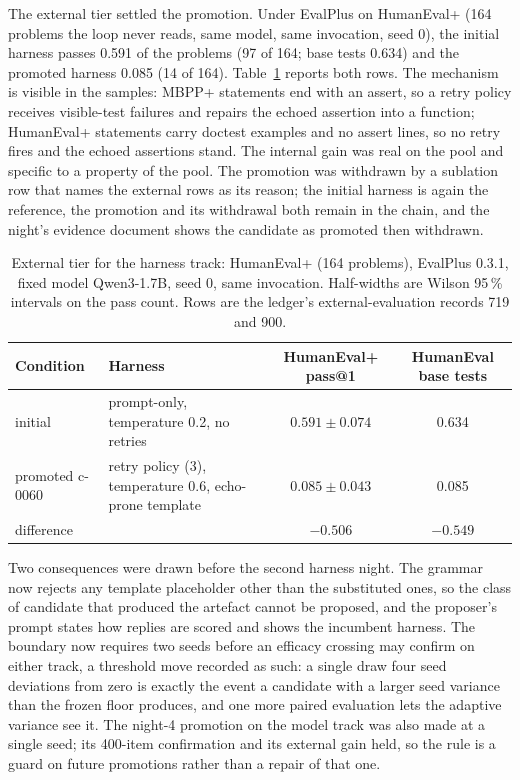 The external tier settled the promotion. Under EvalPlus on HumanEval+ (164 problems the loop never reads, same model, same invocation, seed 0), the initial harness passes 0.591 of the problems (97 of 164; base tests 0.634) and the promoted harness 0.085 (14 of 164). Table~\ref{tab:h-external} reports both rows. The mechanism is visible in the samples: MBPP+ statements end with an assert, so a retry policy receives visible-test failures and repairs the echoed assertion into a function; HumanEval+ statements carry doctest examples and no assert lines, so no retry fires and the echoed assertions stand. The internal gain was real on the pool and specific to a property of the pool. The promotion was withdrawn by a sublation row that names the external rows as its reason; the initial harness is again the reference, the promotion and its withdrawal both remain in the chain, and the night's evidence document shows the candidate as promoted then withdrawn.

\begin{table}[t]
\centering
\caption{External tier for the harness track: HumanEval+ (164 problems), EvalPlus 0.3.1, fixed model Qwen3-1.7B, seed 0, same invocation. Half-widths are Wilson 95\,\% intervals on the pass count. Rows are the ledger's external-evaluation records 719 and 900.}
\label{tab:h-external}
\begin{tabular}{llcc}
\toprule
\textbf{Condition} & \textbf{Harness} & \textbf{HumanEval+ pass@1} & \textbf{HumanEval base tests} \\
\midrule
initial & prompt-only, temperature 0.2, no retries & $0.591 \pm 0.074$ & 0.634 \\
promoted c-0060 & retry policy (3), temperature 0.6, echo-prone template & $0.085 \pm 0.043$ & 0.085 \\
\midrule
difference & & $-0.506$ & $-0.549$ \\
\bottomrule
\end{tabular}
\end{table}

Two consequences were drawn before the second harness night. The grammar now rejects any template placeholder other than the substituted ones, so the class of candidate that produced the artefact cannot be proposed, and the proposer's prompt states how replies are scored and shows the incumbent harness. The boundary now requires two seeds before an efficacy crossing may confirm on either track, a threshold move recorded as such: a single draw four seed deviations from zero is exactly the event a candidate with a larger seed variance than the frozen floor produces, and one more paired evaluation lets the adaptive variance see it. The night-4 promotion on the model track was also made at a single seed; its 400-item confirmation and its external gain held, so the rule is a guard on future promotions rather than a repair of that one.


